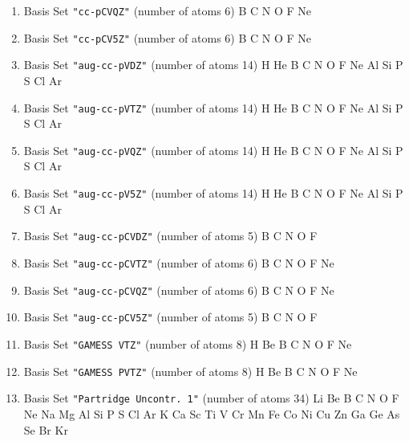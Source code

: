 \begin{enumerate}
\item Basis Set \verb#"cc-pCVQZ"# (number of atoms 6)  \newline 
  B C N O F Ne


\item Basis Set \verb#"cc-pCV5Z"# (number of atoms 6)  \newline 
  B C N O F Ne


\item Basis Set \verb#"aug-cc-pVDZ"# (number of atoms 14)  \newline 
  H He B C N O F Ne Al Si P S Cl Ar


\item Basis Set \verb#"aug-cc-pVTZ"# (number of atoms 14)  \newline 
  H He B C N O F Ne Al Si P S Cl Ar


\item Basis Set \verb#"aug-cc-pVQZ"# (number of atoms 14)  \newline 
  H He B C N O F Ne Al Si P S Cl Ar


\item Basis Set \verb#"aug-cc-pV5Z"# (number of atoms 14)  \newline 
  H He B C N O F Ne Al Si P S Cl Ar


\item Basis Set \verb#"aug-cc-pCVDZ"# (number of atoms 5)  \newline 
  B C N O F


\item Basis Set \verb#"aug-cc-pCVTZ"# (number of atoms 6)  \newline 
  B C N O F Ne


\item Basis Set \verb#"aug-cc-pCVQZ"# (number of atoms 6)  \newline 
  B C N O F Ne


\item Basis Set \verb#"aug-cc-pCV5Z"# (number of atoms 5)  \newline 
  B C N O F


\item Basis Set \verb#"GAMESS VTZ"# (number of atoms 8)  \newline 
  H Be B C N O F Ne


\item Basis Set \verb#"GAMESS PVTZ"# (number of atoms 8)  \newline 
  H Be B C N O F Ne


\item Basis Set \verb#"Partridge Uncontr. 1"# (number of atoms 34)  \newline 
  Li Be B C N O F Ne Na Mg Al Si P S Cl Ar K Ca Sc Ti V Cr Mn Fe Co
 Ni Cu Zn Ga Ge As Se Br Kr



\end{enumerate}
